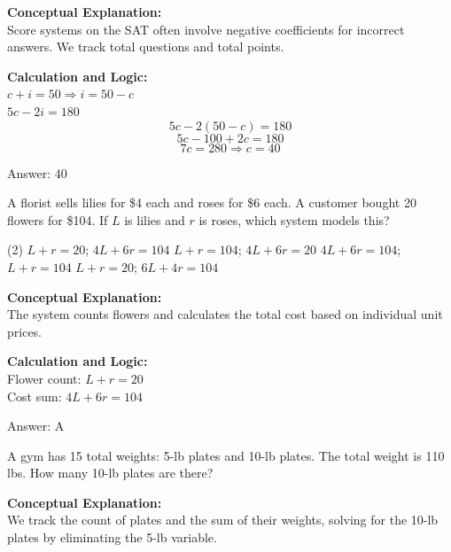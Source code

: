 \documentclass[11pt,paper=a4,answers]{exam}
\begin{document}
\begin{questions}
\begin{solution}
\textbf{Conceptual Explanation:} \\
Score systems on the SAT often involve negative coefficients for incorrect answers. We track total questions and total points.

\vspace{10pt}
\textbf{Calculation and Logic:} \\
$c + i = 50 \Rightarrow i = 50 - c$ \\
$5c - 2i = 180$ \\
\[5c - 2(50 - c) = 180\]
\[5c - 100 + 2c = 180\]
\[7c = 280 \Rightarrow c = 40\]

\vspace{15pt}
Answer: \colorbox{yellow!100}{40}
\end{solution}

\question
A florist sells lilies for \$4 each and roses for \$6 each. A customer bought 20 flowers for \$104. If $L$ is lilies and $r$ is roses, which system models this?
\begin{tasks}(2)
    \task $L + r = 20$; $4L + 6r = 104$
    \task $L + r = 104$; $4L + 6r = 20$
    \task $4L + 6r = 104$; $L + r = 104$
    \task $L + r = 20$; $6L + 4r = 104$
\end{tasks}

\begin{solution}
\textbf{Conceptual Explanation:} \\
The system counts flowers and calculates the total cost based on individual unit prices.

\vspace{10pt}
\textbf{Calculation and Logic:} \\
Flower count: $L + r = 20$ \\
Cost sum: $4L + 6r = 104$

\vspace{15pt}
Answer: \colorbox{yellow!100}{A}
\end{solution}

\question
A gym has 15 total weights: 5-lb plates and 10-lb plates. The total weight is 110 lbs. How many 10-lb plates are there?

\begin{solution}
\textbf{Conceptual Explanation:} \\
We track the count of plates and the sum of their weights, solving for the 10-lb plates by eliminating the 5-lb variable.


\end{solution}
\end{questions}
\end{document}
